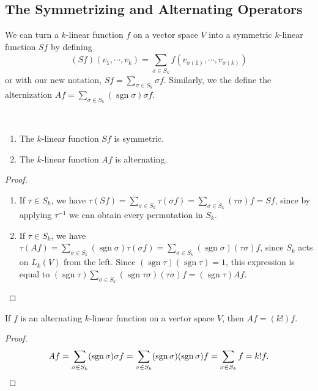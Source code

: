 \subsection{The Symmetrizing and Alternating Operators}
We can turn a $k$-linear function $f$ on a vector space $V$ into a symmetric $k$-linear function $Sf$ by defining \[
    (Sf)(v_1,\cdots ,v_k)= \sum_{\sigma \in S_k}^{} f(v_{\sigma(1)},\cdots ,v_{\sigma(k)})
\] or with our new notation, $Sf=\sum _{\sigma\in S_k}\sigma f$. Similarly, we the define the alternization $Af=\sum_{\sigma\in S_k}(\operatorname{sgn}\sigma)\sigma f$.
\begin{prop}\,
    \begin{enumerate}[label=(\roman*)]
        \item The $k$-linear function $Sf$ is symmetric.
        \item The $k$-linear function $Af$ is alternating.
    \end{enumerate}
\end{prop}
\begin{proof}\,
    \begin{enumerate}[label=(\roman*)]
        \item If $\tau \in S_k$, we have $\tau(Sf)=\sum_{\sigma\in S_k}\tau(\sigma f)=\sum_{\sigma\in S_k}(\tau\sigma)f=Sf$, since by applying $\tau^{-1}$ we can obtain every permutation in $S_k$.
        \item If $\tau \in S_k$, we have $\tau(Af)=\sum_{\sigma \in S_k}(\operatorname{sgn}\sigma)\tau (\sigma f)=\sum_{\sigma \in S_k}(\operatorname{sgn}\sigma)(\tau\sigma)f$, since $S_k$ acts on $L_k(V)$ from the left. Since $(\operatorname{sgn}\tau)(\operatorname{sgn}\tau)=1$, this expression is equal to $(\operatorname{sgn}\tau)\sum_{\sigma\in S_k}(\operatorname{sgn}\tau\sigma)(\tau\sigma)f=(\operatorname{sgn}\tau)Af$.\qedhere
    \end{enumerate}
\end{proof}
\begin{lemma}
    If $f$ is an alternating $k$-linear function on a vector space $V$, then $Af=(k!)f$.
\end{lemma}
\begin{proof}
    \[
        Af=\sum_{\sigma\in S_k}(\operatorname{sgn}\sigma)\sigma f=\sum_{\sigma\in S_k}(\operatorname{sgn}\sigma)(\operatorname{sgn}\sigma)f=\sum_{\sigma\in S_k}f=k!f.\qedhere
    \] 
\end{proof}
